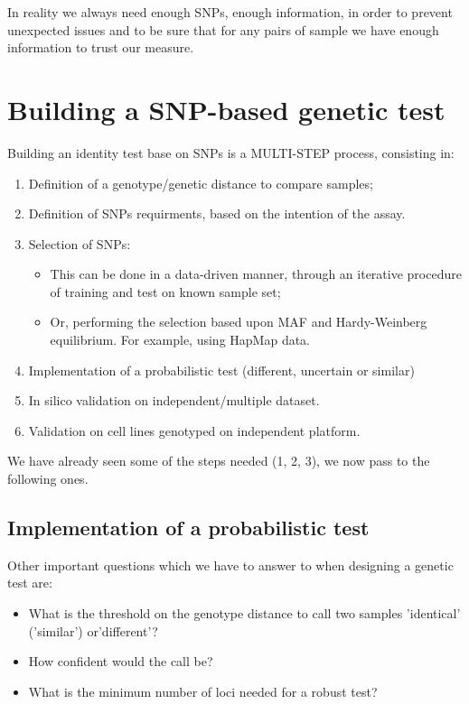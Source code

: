 In reality we always need enough SNPs, enough information, in order to prevent unexpected issues and to be sure that for any pairs of sample we have enough information to trust our measure. 


\section*{Building a SNP-based genetic test}

Building an identity test base on SNPs is a MULTI-STEP process, consisting in: 
\begin{enumerate}
	\item Definition of a genotype/genetic distance to compare samples;
	\item Definition of SNPs requirments, based on the intention of the assay.
	\item Selection of SNPs:
	\begin{itemize}
		\item This can be done in a data-driven manner, through an iterative procedure of training and test on known sample set;
		\item Or, performing the selection based upon MAF and Hardy-Weinberg equilibrium. For example, using HapMap data.
	\end{itemize}
	\item Implementation of a probabilistic test (different, uncertain or similar)
	\item In silico validation on independent/multiple dataset.
	\item Validation on cell lines genotyped on independent platform. 
\end{enumerate}
We have already seen some of the steps needed (1, 2, 3), we now pass to the following ones.


\subsection*{Implementation of a probabilistic test} 

Other important questions which we have to answer to when designing a genetic test are:
\begin{itemize}
	\item What is the threshold on the genotype distance to call two samples 'identical' ('similar') or'different'?
	\item How confident would the call be?
    \item What is the minimum number of loci needed for a robust test?
\end{itemize}

